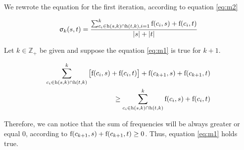
We rewrote the equation for the first iteration, according to equation \ref{eq:m2}

\begin{equation} \label{eq:m2}
	\upsigma_{k}(s,t)=\frac
	{\sum_{c_i \in \textnormal{h}(s,k) \cap \textnormal{h}(t,k), i=1}^k \textnormal{f}(c_i,s)+\textnormal{f}(c_i,t)}
	{|s|+|t|}
\end{equation}

Let $k \in \mathbb{Z}_+$ be given and suppose the equation \ref{eq:m1} is true for $k+1$. %



\begin{equation} \label{eq:k3}
	\begin{split}
	\sum_{c_i \in \textnormal{h}(s,k) \cap \textnormal{h}(t,k)}^{k} \begin{bmatrix} \textnormal{f}(c_i,s)+\textnormal{f}(c_i,t)\end{bmatrix} + \textnormal{f}(c_{k+1},s)+\textnormal{f}(c_{k+1},t) \\
	\geq \sum_{c_i \in \textnormal{h}(s,k) \cap \textnormal{h}(t,k)}^k \textnormal{f}(c_i,s)+\textnormal{f}(c_i,t)
	\end{split}
\end{equation}

Therefore, we can notice that the sum of frequencies will be always greater or equal 0, according to $\textnormal{f}(c_{k+1},s)+\textnormal{f}(c_{k+1},t) \geq 0$. Thus, equation \ref{eq:m1} holds true.



